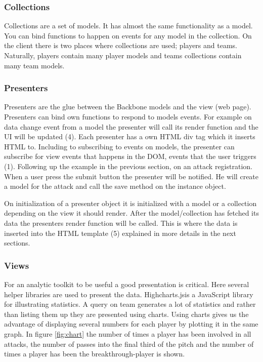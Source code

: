 \subsubsection{Collections}
Collections are a set of models. It has almost the same functionality as a model. You can bind functions to happen on events for any model in the collection. On the client there is two places where collections are used; players and teams. Naturally, players contain many player models and teams collections contain many team models.

\subsubsection{Presenters}

Presenters are the glue between the Backbone models and the view (web page).  Presenters can bind own functions to respond to models events. For example on data change event from a model the presenter will call its render function and the \ac{UI} will be updated (4). Each presenter has a own \ac{HTML} div tag which it inserts HTML to. Including to subscribing to events on models, the presenter can subscribe for view events that happens in the \ac{DOM}, events that the user triggers (1). Following up the example in the previous section, on an attack registration. When a user press the submit button the presenter will be notified. He will create a model for the attack and call the save method on the instance object. 

On initialization of a presenter object it is initialized with a model or a collection depending on the view it should render.  After the model/collection has fetched its data the presenters render function will be called. This is where the data is inserted into the \ac{HTML} template (5) explained in more details in the next sections.

\subsubsection{Views}

For an analytic toolkit to be useful a good presentation is critical. Here several helper libraries are used to present the data. Highcharts.js\footnotemark is a JavaScript library for illustrating statistics. A query on team generates a lot of statistics and rather than listing them up they are presented using charts. Using charts gives us the advantage of displaying several numbers for each player by plotting it in the same graph. In figure \ref{fig:chart} the number of times a player has been involved in all attacks, the number of passes into the final third of the pitch and the number of times a player has been the breakthrough-player is shown.

